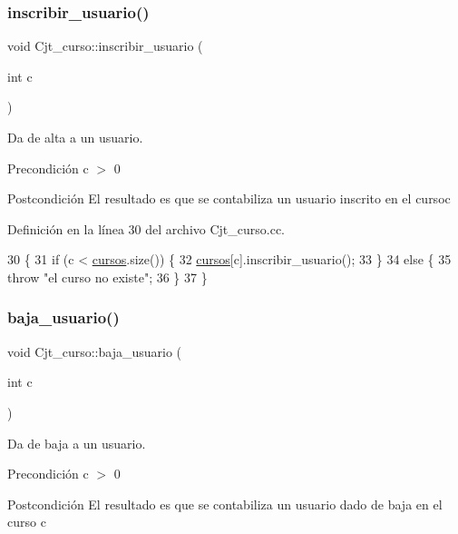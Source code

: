 \subsubsection{\texorpdfstring{inscribir\+\_\+usuario()}{inscribir\_usuario()}}
{\footnotesize\ttfamily void Cjt\+\_\+curso\+::inscribir\+\_\+usuario (\begin{DoxyParamCaption}\item[{int}]{c }\end{DoxyParamCaption})}



Da de alta a un usuario. 

\begin{DoxyPrecond}{Precondición}
c $>$ 0 
\end{DoxyPrecond}
\begin{DoxyPostcond}{Postcondición}
El resultado es que se contabiliza un usuario inscrito en el cursoc 
\end{DoxyPostcond}


Definición en la línea 30 del archivo Cjt\+\_\+curso.\+cc.


\begin{DoxyCode}
30                                        \{
31   \textcolor{keywordflow}{if} (c < \mbox{\hyperlink{class_cjt__curso_af8d4def315cf56b9aab3328bf80bb32c}{cursos}}.size()) \{
32     \mbox{\hyperlink{class_cjt__curso_af8d4def315cf56b9aab3328bf80bb32c}{cursos}}[c].inscribir\_usuario();
33   \}
34   \textcolor{keywordflow}{else} \{
35     \textcolor{keywordflow}{throw} \textcolor{stringliteral}{"el curso no existe"};
36   \}
37 \}
\end{DoxyCode}
\mbox{\label{class_cjt__curso_a7d41a4d58689e02f10093b56fce7947b}} 
\subsubsection{\texorpdfstring{baja\+\_\+usuario()}{baja\_usuario()}}
{\footnotesize\ttfamily void Cjt\+\_\+curso\+::baja\+\_\+usuario (\begin{DoxyParamCaption}\item[{int}]{c }\end{DoxyParamCaption})}



Da de baja a un usuario. 

\begin{DoxyPrecond}{Precondición}
c $>$ 0 
\end{DoxyPrecond}
\begin{DoxyPostcond}{Postcondición}
El resultado es que se contabiliza un usuario dado de baja en el curso c 
\end{DoxyPostcond}


